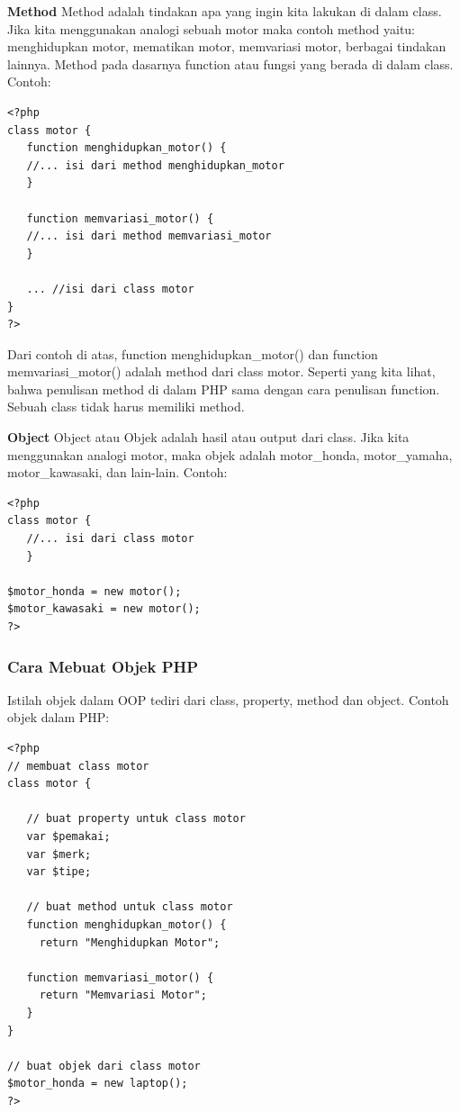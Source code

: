 \newline
\textbf{Method}
\newline
Method adalah tindakan apa yang ingin kita lakukan di dalam class. Jika kita menggunakan analogi sebuah motor maka contoh method yaitu: menghidupkan motor, mematikan motor, memvariasi motor, berbagai tindakan lainnya. Method pada dasarnya function atau fungsi yang berada di dalam class. Contoh:
\begin{lstlisting}
<?php
class motor {
   function menghidupkan_motor() {
   //... isi dari method menghidupkan_motor
   }
 
   function memvariasi_motor() {
   //... isi dari method memvariasi_motor
   }
 
   ... //isi dari class motor
}
?>
\end{lstlisting}

Dari contoh di atas, function menghidupkan\_motor() dan function memvariasi\_motor() adalah method dari class motor. Seperti yang kita lihat, bahwa penulisan method di dalam PHP sama dengan cara penulisan function. Sebuah class tidak harus memiliki method.

\newline
\textbf{Object}
\newline
Object atau Objek adalah hasil atau output dari class. Jika kita menggunakan analogi motor, maka objek adalah motor\_honda, motor\_yamaha, motor\_kawasaki, dan lain-lain. Contoh:
\begin{lstlisting}
<?php
class motor {
   //... isi dari class motor
   }
 
$motor_honda = new motor();
$motor_kawasaki = new motor();
?>
\end{lstlisting}
\subsubsection{Cara Mebuat Objek PHP}
\newline
Istilah objek dalam OOP tediri dari class, property, method dan object. Contoh objek dalam PHP:
\begin{lstlisting}
<?php
// membuat class motor
class motor {
  
   // buat property untuk class motor
   var $pemakai;
   var $merk;
   var $tipe;
  
   // buat method untuk class motor
   function menghidupkan_motor() {
     return "Menghidupkan Motor";
   
   function memvariasi_motor() {
     return "Memvariasi Motor";
   }
}
  
// buat objek dari class motor
$motor_honda = new laptop();
?>
\end{lstlisting}

